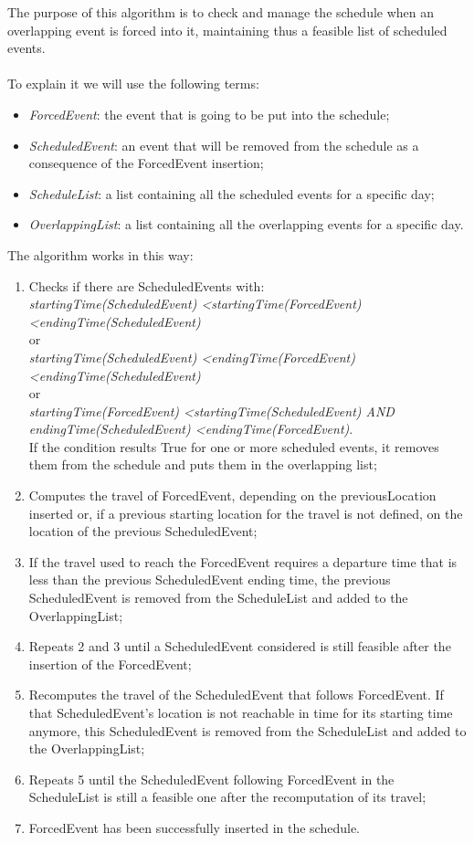 The purpose of this algorithm is to check and manage the schedule when an overlapping event is forced into it, maintaining thus a feasible list of scheduled events. \\ \\
To explain it we will use the following terms: 
\begin{itemize}
	\item \textit{ForcedEvent}: the event that is going to be put into the schedule;
	\item \textit{ScheduledEvent}: an event that will be removed from the schedule as a consequence of the ForcedEvent insertion;
	\item \textit{ScheduleList}: a list containing all the scheduled events for a specific day;
	\item \textit{OverlappingList}: a list containing all the overlapping events for a specific day.
\end{itemize}
\newpage
\noindent The algorithm works in this way:
\begin{enumerate}
	\item Checks if there are ScheduledEvents with: \\ \textit{startingTime(ScheduledEvent) \textless startingTime(ForcedEvent) \textless endingTime(ScheduledEvent)} \\ or \\ \textit{startingTime(ScheduledEvent) \textless endingTime(ForcedEvent) \textless endingTime(ScheduledEvent)} \\
or \\ \textit{startingTime(ForcedEvent) \textless startingTime(ScheduledEvent) AND \\endingTime(ScheduledEvent) \textless endingTime(ForcedEvent)}. \\
	If the condition results True for one or more scheduled events, it removes them from the schedule and puts them in the overlapping list;
	\item Computes the travel of ForcedEvent, depending on the previousLocation inserted or, if a previous starting location for the travel is not defined, on the location of the previous ScheduledEvent;
	\item If the travel used to reach the ForcedEvent requires a departure time that is less than the previous ScheduledEvent ending time, the previous ScheduledEvent is removed from the ScheduleList and added to the OverlappingList;
	\item Repeats 2 and 3 until a ScheduledEvent considered is still feasible after the insertion of the ForcedEvent;
	\item Recomputes the travel of the ScheduledEvent that follows ForcedEvent. If that ScheduledEvent's location is not reachable in time for its starting time anymore, this ScheduledEvent is removed from the ScheduleList and added to the OverlappingList;
	\item Repeats 5 until the ScheduledEvent following ForcedEvent in the ScheduleList is still a feasible one after the recomputation of its travel;
	\item ForcedEvent has been successfully inserted in the schedule.
\end{enumerate}